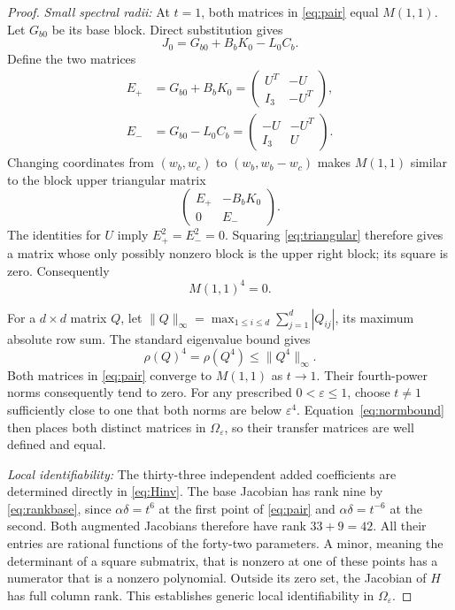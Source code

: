 \documentclass[letterpaper,10pt,conference]{ieeeconf}
\begin{document}
\begin{proof}
\emph{Small spectral radii:}
At \(t=1\), both matrices in \eqref{eq:pair} equal \(M(1,1)\).
Let \(G_{b0}\) be its base block. Direct substitution gives
\[
 J_0=G_{b0}+B_bK_0-L_0C_b.
\]
Define the two matrices
\begin{equation}\label{eq:nilblocks}
\begin{split}
 E_+&=G_{b0}+B_bK_0
       =\begin{pmatrix}U^T&-U\\I_3&-U^T\end{pmatrix},\\
 E_-&=G_{b0}-L_0C_b
       =\begin{pmatrix}-U&-U^T\\I_3&U\end{pmatrix}.
\end{split}
\end{equation}
Changing coordinates from \((w_b,w_c)\) to \((w_b,w_b-w_c)\) makes
\(M(1,1)\) similar to the block upper triangular matrix
\begin{equation}\label{eq:triangular}
 \begin{pmatrix}E_+&-B_bK_0\\0&E_-\end{pmatrix}.
\end{equation}
The identities for \(U\) imply \(E_+^2=E_-^2=0\).
Squaring \eqref{eq:triangular} therefore gives a matrix whose only
possibly nonzero block is the upper right block; its square is zero.
Consequently
\begin{equation}\label{eq:nilpotent}
 M(1,1)^4=0.
\end{equation}

For a \(d\times d\) matrix \(Q\), let
\(\|Q\|_\infty=\max_{1\le i\le d}\sum_{j=1}^d|Q_{ij}|\), its maximum
absolute row sum.
The standard eigenvalue bound gives
\begin{equation}\label{eq:normbound}
 \rho(Q)^4=\rho(Q^4)\le\|Q^4\|_\infty.
\end{equation}
Both matrices in \eqref{eq:pair} converge to \(M(1,1)\) as \(t\to1\).
Their fourth-power norms consequently tend to zero.
For any prescribed \(0<\varepsilon\le1\), choose \(t\ne1\)
sufficiently close to one that both norms are below \(\varepsilon^4\).
Equation~\eqref{eq:normbound} then places both distinct matrices in
\(\Omega_\varepsilon\), so their transfer matrices are well defined and equal.

\emph{Local identifiability:}
The thirty-three independent added coefficients are determined directly
in \eqref{eq:Hinv}. The base Jacobian has rank nine by
\eqref{eq:rankbase}, since \(\alpha\delta=t^6\) at the first point of
\eqref{eq:pair} and \(\alpha\delta=t^{-6}\) at the second.
Both augmented Jacobians therefore have rank \(33+9=42\).
All their entries are rational functions of the forty-two parameters.
A minor, meaning the determinant of a square submatrix, that is
nonzero at one of these points has a numerator that is a
nonzero polynomial. Outside its zero set, the Jacobian of \(H\)
has full column rank. This establishes generic local identifiability
in \(\Omega_\varepsilon\).


\end{proof}
\end{document}
